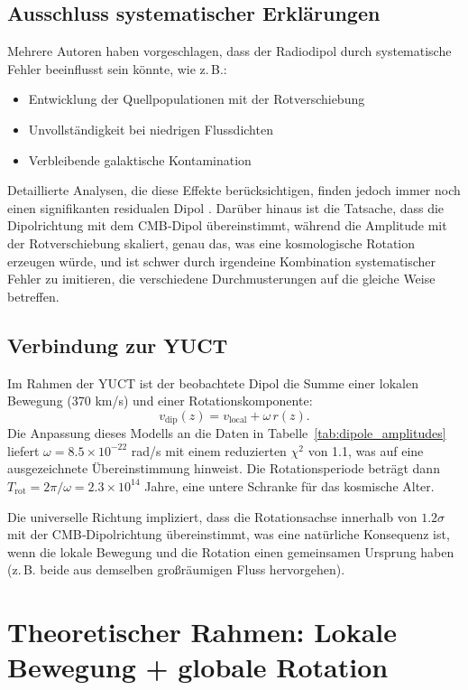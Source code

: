 \documentclass[11pt,a4paper]{article}
\begin{document}
	\subsection{Ausschluss systematischer Erklärungen}
	
	Mehrere Autoren haben vorgeschlagen, dass der Radiodipol durch systematische Fehler beeinflusst sein könnte, wie z. B.:
	\begin{itemize}
		\item Entwicklung der Quellpopulationen mit der Rotverschiebung
		\item Unvollständigkeit bei niedrigen Flussdichten
		\item Verbleibende galaktische Kontamination
	\end{itemize}
	Detaillierte Analysen, die diese Effekte berücksichtigen, finden jedoch immer noch einen signifikanten residualen Dipol \cite{Oayda2024, Singal2024, Wagenveld2025}. Darüber hinaus ist die Tatsache, dass die Dipolrichtung mit dem CMB‑Dipol übereinstimmt, während die Amplitude mit der Rotverschiebung skaliert, genau das, was eine kosmologische Rotation erzeugen würde, und ist schwer durch irgendeine Kombination systematischer Fehler zu imitieren, die verschiedene Durchmusterungen auf die gleiche Weise betreffen.
	
	\subsection{Verbindung zur YUCT}
	
	Im Rahmen der YUCT ist der beobachtete Dipol die Summe einer lokalen Bewegung (370 km/s) und einer Rotationskomponente:
	\[
	v_{\mathrm{dip}}(z) = v_{\mathrm{local}} + \omega \, r(z).
	\]
	Die Anpassung dieses Modells an die Daten in Tabelle~\ref{tab:dipole_amplitudes} liefert \(\omega = 8.5\times10^{-22}\) rad/s mit einem reduzierten \(\chi^2\) von 1.1, was auf eine ausgezeichnete Übereinstimmung hinweist. Die Rotationsperiode beträgt dann \(T_{\mathrm{rot}} = 2\pi/\omega = 2.3\times10^{14}\) Jahre, eine untere Schranke für das kosmische Alter.
	
	Die universelle Richtung impliziert, dass die Rotationsachse innerhalb von \(1.2\sigma\) mit der CMB‑Dipolrichtung übereinstimmt, was eine natürliche Konsequenz ist, wenn die lokale Bewegung und die Rotation einen gemeinsamen Ursprung haben (z. B. beide aus demselben großräumigen Fluss hervorgehen).
	
	\section{Theoretischer Rahmen: Lokale Bewegung + globale Rotation}
	
\end{document}
